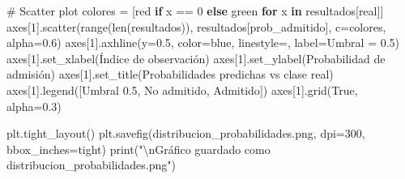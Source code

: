 \documentclass[
  doc,
  floatsintext,
  longtable,
  a4paper,
  nolmodern,
  notxfonts,
  notimes,
  12pt,
  colorlinks=true,linkcolor=blue,citecolor=blue,urlcolor=blue]{apa7}
\newenvironment{Shaded}{\begin{snugshade}}{\end{snugshade}}
\newcommand{\BuiltInTok}[1]{\textcolor[rgb]{0.00,0.23,0.31}{#1}}
\newcommand{\CharTok}[1]{\textcolor[rgb]{0.13,0.47,0.30}{#1}}
\newcommand{\CommentTok}[1]{\textcolor[rgb]{0.37,0.37,0.37}{#1}}
\newcommand{\ControlFlowTok}[1]{\textcolor[rgb]{0.00,0.23,0.31}{\textbf{#1}}}
\newcommand{\DecValTok}[1]{\textcolor[rgb]{0.68,0.00,0.00}{#1}}
\newcommand{\FloatTok}[1]{\textcolor[rgb]{0.68,0.00,0.00}{#1}}
\newcommand{\KeywordTok}[1]{\textcolor[rgb]{0.00,0.23,0.31}{\textbf{#1}}}
\newcommand{\NormalTok}[1]{\textcolor[rgb]{0.00,0.23,0.31}{#1}}
\newcommand{\OperatorTok}[1]{\textcolor[rgb]{0.37,0.37,0.37}{#1}}
\newcommand{\StringTok}[1]{\textcolor[rgb]{0.13,0.47,0.30}{#1}}
\newcommand{\VariableTok}[1]{\textcolor[rgb]{0.07,0.07,0.07}{#1}}
\begin{document}
\begin{Shaded}
\begin{Highlighting}[]
\CommentTok{\# Scatter plot}
\NormalTok{colores }\OperatorTok{=}\NormalTok{ [}\StringTok{\textquotesingle{}red\textquotesingle{}} \ControlFlowTok{if}\NormalTok{ x }\OperatorTok{==} \DecValTok{0} \ControlFlowTok{else} \StringTok{\textquotesingle{}green\textquotesingle{}} \ControlFlowTok{for}\NormalTok{ x }\KeywordTok{in}\NormalTok{ resultados[}\StringTok{\textquotesingle{}real\textquotesingle{}}\NormalTok{]]}
\NormalTok{axes[}\DecValTok{1}\NormalTok{].scatter(}\BuiltInTok{range}\NormalTok{(}\BuiltInTok{len}\NormalTok{(resultados)), }
\NormalTok{                resultados[}\StringTok{\textquotesingle{}prob\_admitido\textquotesingle{}}\NormalTok{],}
\NormalTok{                c}\OperatorTok{=}\NormalTok{colores, alpha}\OperatorTok{=}\FloatTok{0.6}\NormalTok{)}
\NormalTok{axes[}\DecValTok{1}\NormalTok{].axhline(y}\OperatorTok{=}\FloatTok{0.5}\NormalTok{, color}\OperatorTok{=}\StringTok{\textquotesingle{}blue\textquotesingle{}}\NormalTok{, linestyle}\OperatorTok{=}\StringTok{\textquotesingle{}{-}{-}\textquotesingle{}}\NormalTok{, label}\OperatorTok{=}\StringTok{\textquotesingle{}Umbral = 0.5\textquotesingle{}}\NormalTok{)}
\NormalTok{axes[}\DecValTok{1}\NormalTok{].set\_xlabel(}\StringTok{\textquotesingle{}Índice de observación\textquotesingle{}}\NormalTok{)}
\NormalTok{axes[}\DecValTok{1}\NormalTok{].set\_ylabel(}\StringTok{\textquotesingle{}Probabilidad de admisión\textquotesingle{}}\NormalTok{)}
\NormalTok{axes[}\DecValTok{1}\NormalTok{].set\_title(}\StringTok{\textquotesingle{}Probabilidades predichas vs clase real\textquotesingle{}}\NormalTok{)}
\NormalTok{axes[}\DecValTok{1}\NormalTok{].legend([}\StringTok{\textquotesingle{}Umbral 0.5\textquotesingle{}}\NormalTok{, }\StringTok{\textquotesingle{}No admitido\textquotesingle{}}\NormalTok{, }\StringTok{\textquotesingle{}Admitido\textquotesingle{}}\NormalTok{])}
\NormalTok{axes[}\DecValTok{1}\NormalTok{].grid(}\VariableTok{True}\NormalTok{, alpha}\OperatorTok{=}\FloatTok{0.3}\NormalTok{)}

\NormalTok{plt.tight\_layout()}
\NormalTok{plt.savefig(}\StringTok{\textquotesingle{}distribucion\_probabilidades.png\textquotesingle{}}\NormalTok{, dpi}\OperatorTok{=}\DecValTok{300}\NormalTok{, bbox\_inches}\OperatorTok{=}\StringTok{\textquotesingle{}tight\textquotesingle{}}\NormalTok{)}
\BuiltInTok{print}\NormalTok{(}\StringTok{"}\CharTok{\textbackslash{}n}\StringTok{Gráfico guardado como \textquotesingle{}distribucion\_probabilidades.png\textquotesingle{}"}\NormalTok{)}
\end{Highlighting}
\end{Shaded}
\end{document}
